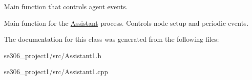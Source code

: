 Main function that controls agent events. 

Main function for the \hyperlink{classAssistant}{Assistant} process. Controls node setup and periodic events. 

The documentation for this class was generated from the following files\-:\begin{DoxyCompactItemize}
\item 
se306\-\_\-project1/src/Assistant1.\-h\item 
se306\-\_\-project1/src/Assistant1.\-cpp\end{DoxyCompactItemize}
